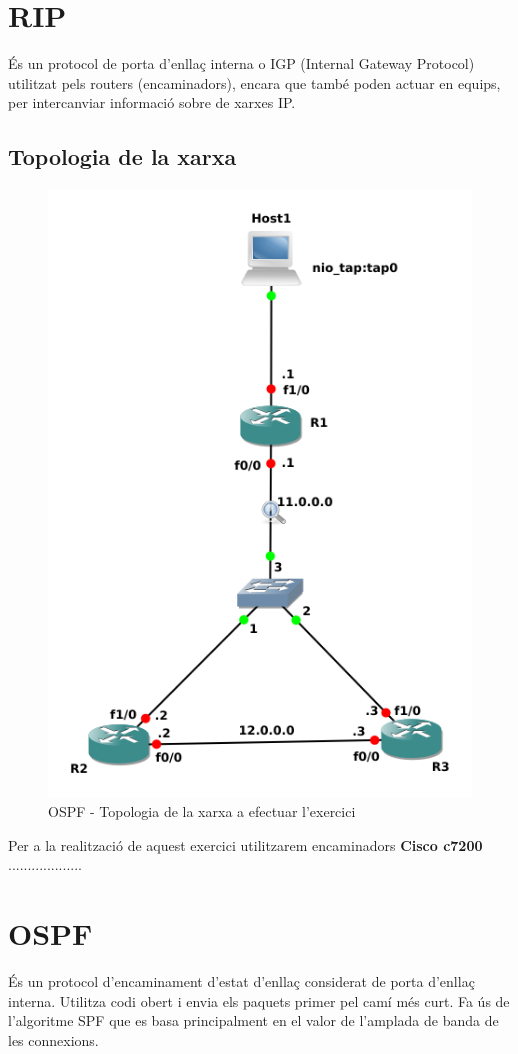 \documentclass[10pt]{article}
\begin{document}
\section{RIP}
És un protocol de porta d'enllaç interna o IGP (Internal Gateway Protocol) utilitzat pels routers (encaminadors), encara que també poden actuar en equips, per intercanviar informació sobre de xarxes IP.
\subsection{Topologia de la xarxa}
\begin{figure}[H]
\begin{center}
\includegraphics[scale=0.5]{Images/rip.png}
\caption{OSPF - Topologia de la xarxa a efectuar l'exercici}
\end{center}
\end{figure}
Per a la realització de aquest exercici utilitzarem encaminadors \textbf{Cisco c7200}
...................
\section{OSPF}
És un protocol d'encaminament d'estat d'enllaç considerat de porta d'enllaç interna. Utilitza codi obert i envia els paquets primer pel camí més curt. Fa ús de l'algoritme SPF que es basa principalment en el valor de l'amplada de banda de les connexions.
\end{document}
